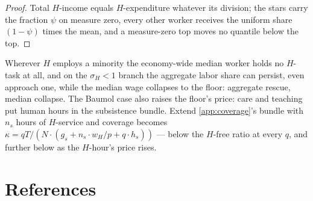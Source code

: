 \documentclass[12pt]{article}
\theoremstyle{plain}
\begin{document}
\begin{proof}
Total $H$-income equals $H$-expenditure whatever its division; the stars carry the fraction $\psi$ on measure zero, every other worker receives the uniform share $(1-\psi )$ times the mean, and a measure-zero top moves no quantile below the top.
\end{proof}

Wherever $H$ employs a minority the economy-wide median worker holds no $H$-task at all, and on the $\sigma _H < 1$ branch the aggregate labor share can persist, even approach one, while the median wage collapses to the floor: aggregate rescue, median collapse. The Baumol case also raises the floor's price: care and teaching put human hours in the subsistence bundle. Extend \ref{app:coverage}'s bundle with $n_s$ hours of $H$-service and coverage becomes $\kappa = qT/(N\cdot (g_s + n_s\cdot w_H/p + q\cdot h_s))$ --- below the $H$-free ratio at every $q$, and further below as the $H$-hour's price rises.

\section*{References}
\end{document}
